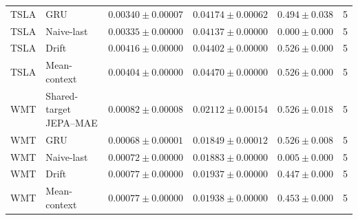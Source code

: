 \begin{longtable}{llrrrr}
TSLA & GRU & $0.00340 \pm 0.00007$ & $0.04174 \pm 0.00062$ & $0.494 \pm 0.038$ & 5 \\
TSLA & Naive-last & $0.00335 \pm 0.00000$ & $0.04137 \pm 0.00000$ & $0.000 \pm 0.000$ & 5 \\
TSLA & Drift & $0.00416 \pm 0.00000$ & $0.04402 \pm 0.00000$ & $0.526 \pm 0.000$ & 5 \\
TSLA & Mean-context & $0.00404 \pm 0.00000$ & $0.04470 \pm 0.00000$ & $0.526 \pm 0.000$ & 5 \\
WMT & Shared-target JEPA--MAE & $0.00082 \pm 0.00008$ & $0.02112 \pm 0.00154$ & $0.526 \pm 0.018$ & 5 \\
WMT & GRU & $0.00068 \pm 0.00001$ & $0.01849 \pm 0.00012$ & $0.526 \pm 0.008$ & 5 \\
WMT & Naive-last & $0.00072 \pm 0.00000$ & $0.01883 \pm 0.00000$ & $0.005 \pm 0.000$ & 5 \\
WMT & Drift & $0.00077 \pm 0.00000$ & $0.01937 \pm 0.00000$ & $0.447 \pm 0.000$ & 5 \\
WMT & Mean-context & $0.00077 \pm 0.00000$ & $0.01938 \pm 0.00000$ & $0.453 \pm 0.000$ & 5 \\
\bottomrule
\end{longtable}
